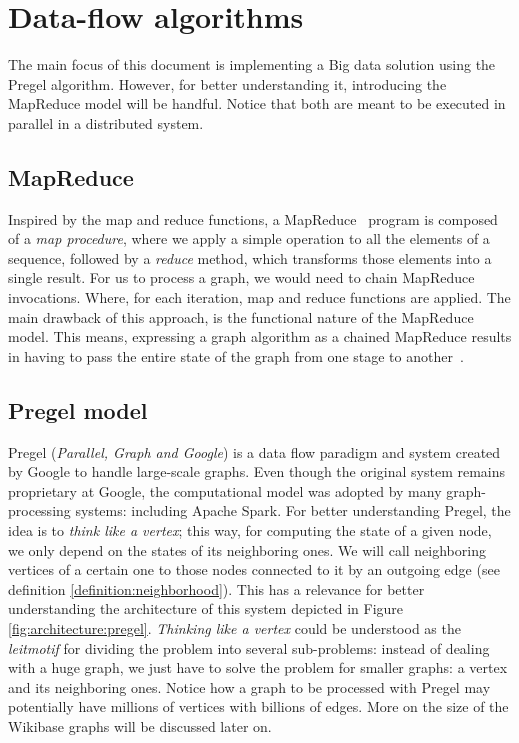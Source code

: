 \section{Data-flow algorithms}

The main focus of this document is implementing a Big data solution using the Pregel algorithm. However, for better understanding it, introducing the MapReduce model will be handful. Notice that both are meant to be executed in parallel in a distributed system.

\subsection{MapReduce}

Inspired by the map and reduce functions, a MapReduce~\cite{wiki:MapReduce} program is composed of a \textit{map procedure}, where we apply a simple operation to all the elements of a sequence, followed by a \textit{reduce} method, which transforms those elements into a single result. For us to process a graph, we would need to chain MapReduce invocations. Where, for each iteration, map and reduce functions are applied. The main drawback of this approach, is the functional nature of the MapReduce model. This means, expressing a graph algorithm as a chained MapReduce results in having to pass the entire state of the graph from one stage to another~\cite{10.1145/1807167.1807184}.

\subsection{Pregel model}
\label{section:pregel}

Pregel (\textit{Parallel, Graph and Google}) is a data flow paradigm and system created by Google to handle large-scale graphs. Even though the original system remains proprietary at Google, the computational model was adopted by many graph-processing systems: including Apache Spark. For better understanding Pregel, the idea is to \textit{think like a vertex}; this way, for computing the state of a given node, we only depend on the states of its neighboring ones. We will call neighboring vertices of a certain one to those nodes connected to it by an outgoing edge (see definition \ref{definition:neighborhood}). This has a relevance for better understanding the architecture of this system depicted in Figure \ref{fig:architecture:pregel}. \textit{Thinking like a vertex} could be understood as the \textit{leitmotif} for dividing the problem into several sub-problems: instead of dealing with a huge graph, we just have to solve the problem for smaller graphs: a vertex and its neighboring ones. Notice how a graph to be processed with Pregel may potentially have millions of vertices with billions of edges. More on the size of the Wikibase graphs will be discussed later on.

